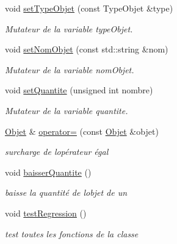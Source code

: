 \begin{DoxyCompactItemize}
void \hyperlink{class_objet_a2183a02ee228f3ba1e52e0e5b9904dce}{set\+Type\+Objet} (const Type\+Objet \&type)
\begin{DoxyCompactList}\small\item\em Mutateur de la variable type\+Objet. \end{DoxyCompactList}\item 
void \hyperlink{class_objet_a666418b066069a2a5e35f88dc1f77f0f}{set\+Nom\+Objet} (const std\+::string \&nom)
\begin{DoxyCompactList}\small\item\em Mutateur de la variable nom\+Objet. \end{DoxyCompactList}\item 
void \hyperlink{class_objet_a92eac9151b39f0a03a94ba02f25018c9}{set\+Quantite} (unsigned int nombre)
\begin{DoxyCompactList}\small\item\em Mutateur de la variable quantite. \end{DoxyCompactList}\item 
\hyperlink{class_objet}{Objet} \& \hyperlink{class_objet_a9e4b0fb73f3a95425f0239c91c7513f4}{operator=} (const \hyperlink{class_objet}{Objet} \&objet)
\begin{DoxyCompactList}\small\item\em surcharge de l\textquotesingle{}opérateur égal \end{DoxyCompactList}\item 
\mbox{\label{class_objet_aa39f9e7546969cc0a53a2412deb4d27a}} 
void \hyperlink{class_objet_aa39f9e7546969cc0a53a2412deb4d27a}{baisser\+Quantite} ()
\begin{DoxyCompactList}\small\item\em baisse la quantité de l\textquotesingle{}objet de un \end{DoxyCompactList}\item 
\mbox{\label{class_objet_a1e7b9c9e5cc9417b182258bcb7a0ae21}} 
void \hyperlink{class_objet_a1e7b9c9e5cc9417b182258bcb7a0ae21}{test\+Regression} ()
\begin{DoxyCompactList}\small\item\em test toutes les fonctions de la classe \end{DoxyCompactList}\end{DoxyCompactItemize}
